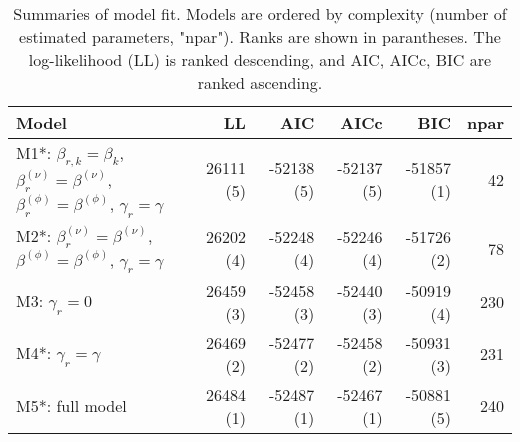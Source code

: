 \begin{table}[ht]
\centering
\begingroup\fontsize{9pt}{10pt}\selectfont
\begin{tabular}{l|rrrrr}
  \hline
Model & LL & AIC & AICc & BIC & npar \\ 
  \hline
M1*: $\beta_{r,k} = \beta_{k}$, $\beta_{r}^{(\nu)} = \beta^{(\nu)}$, $\beta_{r}^{(\phi)} = \beta^{(\phi)}$, $\gamma_r = \gamma$ & 26111 (5) & -52138 (5) & -52137 (5) & -51857 (1) & 42 \\ 
  M2*: $\beta_{r}^{(\nu)} = \beta^{(\nu)}$, $\beta^{(\phi)} = \beta^{(\phi)}$, $\gamma_r = \gamma$ & 26202 (4) & -52248 (4) & -52246 (4) & -51726 (2) & 78 \\ 
  M3: $\gamma_r = 0$ & 26459 (3) & -52458 (3) & -52440 (3) & -50919 (4) & 230 \\ 
  M4*: $\gamma_r = \gamma$ & 26469 (2) & -52477 (2) & -52458 (2) & -50931 (3) & 231 \\ 
  M5*: full model & 26484 (1) & -52487 (1) & -52467 (1) & -50881 (5) & 240 \\ 
   \hline
\end{tabular}
\endgroup
\caption{Summaries of model fit.
             Models are ordered by complexity (number of estimated parameters, "npar").
             Ranks are shown in parantheses.
             The log-likelihood (LL) is ranked descending,
             and AIC, AICc, BIC are ranked ascending.} 
\label{tab:mBetafit}
\end{table}
